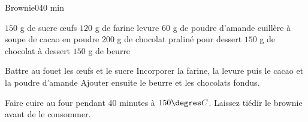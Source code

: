 \begin{recette}{Brownie}{0}{}{40 min}
\begin{ingredients}[8 pers.]
\ingredient $150$ g de sucre
 œufs
\ingredient $120$ g de farine
\ingredient levure
\ingredient $60$ g de poudre d'amande
 cuillère à soupe de cacao en poudre
\ingredient $200$ g de chocolat praliné pour dessert
\ingredient $150$ g de chocolat à dessert
\ingredient $150$ g de beurre
\end{ingredients}

\begin{preparation}
\etape Battre au fouet les œufs et le sucre
\etape Incorporer la farine, la levure puis le cacao et la poudre d'amande
\etape Ajouter ensuite le beurre et les chocolats fondus.
\end{preparation}

\begin{cuisson}
Faire cuire au four pendant 40 minutes à $150\degres C$. Laissez tiédir le brownie avant de le consommer.
\end{cuisson}
\end{recette}

